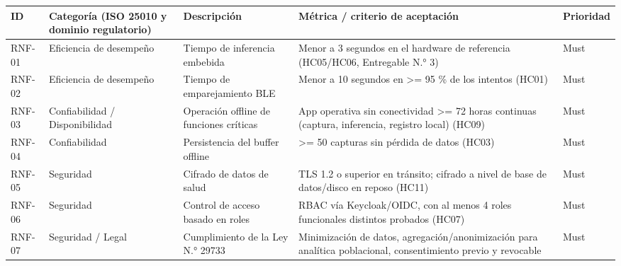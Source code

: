 \documentclass[11pt,a4paper]{article}
\begin{document}
{\small
\begin{longtable}[]{@{}
  >{\raggedright\arraybackslash}p{}
  >{\raggedright\arraybackslash}p{}
  >{\raggedright\arraybackslash}p{}
  >{\raggedright\arraybackslash}p{}
  >{\raggedright\arraybackslash}p{}@{}}
\toprule\noalign{}
\begin{minipage}[b]{\linewidth}\raggedright
ID
\end{minipage} & \begin{minipage}[b]{\linewidth}\raggedright
Categoría (ISO 25010 y dominio regulatorio)
\end{minipage} & \begin{minipage}[b]{\linewidth}\raggedright
Descripción
\end{minipage} & \begin{minipage}[b]{\linewidth}\raggedright
Métrica / criterio de aceptación
\end{minipage} & \begin{minipage}[b]{\linewidth}\raggedright
Prioridad
\end{minipage} \\
\midrule\noalign{}
\endhead
\bottomrule\noalign{}
\endlastfoot
RNF-01 & Eficiencia de desempeño & Tiempo de inferencia embebida & Menor a 3 segundos en el hardware de referencia (HC05/HC06, Entregable N.° 3) & Must \\
RNF-02 & Eficiencia de desempeño & Tiempo de emparejamiento BLE & Menor a 10 segundos en \textgreater= 95 \% de los intentos (HC01) & Must \\
RNF-03 & Confiabilidad / Disponibilidad & Operación offline de funciones críticas & App operativa sin conectividad \textgreater= 72 horas continuas (captura, inferencia, registro local) (HC09) & Must \\
RNF-04 & Confiabilidad & Persistencia del buffer offline & \textgreater= 50 capturas sin pérdida de datos (HC03) & Must \\
RNF-05 & Seguridad & Cifrado de datos de salud & TLS 1.2 o superior en tránsito; cifrado a nivel de base de datos/disco en reposo (HC11) & Must \\
RNF-06 & Seguridad & Control de acceso basado en roles & RBAC vía Keycloak/OIDC, con al menos 4 roles funcionales distintos probados (HC07) & Must \\
RNF-07 & Seguridad / Legal & Cumplimiento de la Ley N.° 29733 & Minimización de datos, agregación/anonimización para analítica poblacional, consentimiento previo y revocable & Must \\

\end{longtable}}
\end{document}
